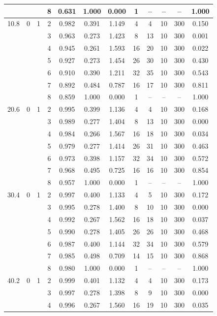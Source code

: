 \documentclass[12pt]{article}
\begin{document}
\begin{table}
\begin{ruledtabular}
\begin{tabular}{cccccccccccc}
 & &  & 8 & 0.631 & 1.000 & 0.000 & 1 & -- & -- & -- & 1.000 \\
\hline
10.8 & 0 & 1 & 2 & 0.982 & 0.391 & 1.149 & 4 & 4 & 10 & 300 & 0.150 \\
 & &  & 3 & 0.963 & 0.273 & 1.423 & 8 & 13 & 10 & 300 & 0.001 \\
 & &  & 4 & 0.945 & 0.261 & 1.593 & 16 & 20 & 10 & 300 & 0.022 \\
 & &  & 5 & 0.927 & 0.273 & 1.454 & 26 & 30 & 10 & 300 & 0.430 \\
 & &  & 6 & 0.910 & 0.390 & 1.211 & 32 & 35 & 10 & 300 & 0.543 \\
 & &  & 7 & 0.892 & 0.484 & 0.787 & 16 & 17 & 10 & 300 & 0.811 \\
 & &  & 8 & 0.859 & 1.000 & 0.000 & 1 & -- & -- & -- & 1.000 \\
\hline
20.6 & 0 & 1 & 2 & 0.995 & 0.399 & 1.136 & 4 & 4 & 10 & 300 & 0.168 \\
 & &  & 3 & 0.989 & 0.277 & 1.404 & 8 & 13 & 10 & 300 & 0.000 \\
 & &  & 4 & 0.984 & 0.266 & 1.567 & 16 & 18 & 10 & 300 & 0.034 \\
 & &  & 5 & 0.979 & 0.277 & 1.414 & 26 & 31 & 10 & 300 & 0.463 \\
 & &  & 6 & 0.973 & 0.398 & 1.157 & 32 & 34 & 10 & 300 & 0.572 \\
 & &  & 7 & 0.968 & 0.495 & 0.725 & 16 & 16 & 10 & 300 & 0.854 \\
 & &  & 8 & 0.957 & 1.000 & 0.000 & 1 & -- & -- & -- & 1.000 \\
\hline
30.4 & 0 & 1 & 2 & 0.997 & 0.400 & 1.133 & 4 & 5 & 10 & 300 & 0.172 \\
 & &  & 3 & 0.995 & 0.278 & 1.400 & 8 & 10 & 10 & 300 & 0.000 \\
 & &  & 4 & 0.992 & 0.267 & 1.562 & 16 & 18 & 10 & 300 & 0.037 \\
 & &  & 5 & 0.990 & 0.278 & 1.405 & 26 & 26 & 10 & 300 & 0.468 \\
 & &  & 6 & 0.987 & 0.400 & 1.144 & 32 & 34 & 10 & 300 & 0.579 \\
 & &  & 7 & 0.985 & 0.498 & 0.709 & 14 & 15 & 10 & 300 & 0.868 \\
 & &  & 8 & 0.980 & 1.000 & 0.000 & 1 & -- & -- & -- & 1.000 \\
\hline
40.2 & 0 & 1 & 2 & 0.999 & 0.401 & 1.132 & 4 & 4 & 10 & 300 & 0.173 \\
 & &  & 3 & 0.997 & 0.278 & 1.398 & 8 & 9 & 10 & 300 & 0.000 \\
 & &  & 4 & 0.996 & 0.267 & 1.560 & 16 & 19 & 10 & 300 & 0.035 \\

\end{tabular}
\end{ruledtabular}
\end{table}
\end{document}
